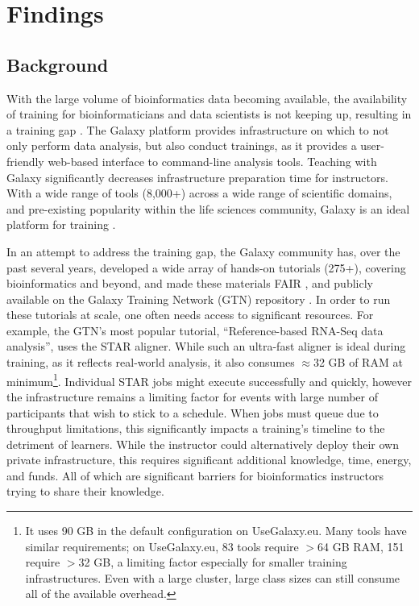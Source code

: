 \documentclass[a4paper,num-refs]{oup-contemporary}
\begin{document}
\section{Findings}
\subsection{Background}


With the large volume of bioinformatics data becoming available, the availability of training for bioinformaticians and data scientists is not keeping up, resulting in a training gap \cite{Attwood2017}.
The Galaxy platform \cite{afgan2018galaxy} provides infrastructure on which to not only perform data analysis, but also conduct trainings, as it provides a user-friendly web-based interface to command-line analysis tools. Teaching with Galaxy significantly decreases infrastructure preparation time for instructors. With a wide range of tools (8,000+) across a wide range of scientific domains, and pre-existing popularity within the life sciences community, Galaxy is an ideal platform for training \cite{gtn,gtn2}.

In an attempt to address the training gap, the Galaxy community has, over the past several years, developed a wide array of hands-on tutorials (275+), covering bioinformatics and beyond, and made these materials FAIR \cite{Wilkinson2016-zo,10.1371/journal.pcbi.1007854}, and publicly available on the Galaxy Training Network (GTN) repository \cite{training-site}. In order to run these tutorials at scale, one often needs access to significant resources. For example, the GTN's most popular tutorial, ``Reference-based RNA-Seq data analysis'', uses the STAR aligner\cite{Dobin2012}. While such an ultra-fast aligner is ideal during training, as it reflects real-world analysis, it also consumes $\approx$32 GB of RAM at minimum\footnote{It uses 90 GB in the default configuration on UseGalaxy.eu. Many tools have similar requirements; on UseGalaxy.eu, 83 tools require $>$64 GB RAM, 151 require $>$32 GB, a limiting factor especially for smaller training infrastructures. Even with a large cluster, large class sizes can still consume all of the available overhead.}. Individual STAR jobs might execute successfully and quickly, however the infrastructure remains a limiting factor for events with large number of participants that wish to stick to a schedule. When jobs must queue due to throughput limitations, this significantly impacts a training's timeline to the detriment of learners. While the instructor could alternatively deploy their own private infrastructure, this requires significant additional knowledge, time, energy, and funds. All of which are significant barriers for bioinformatics instructors trying to share their knowledge.
\end{document}
